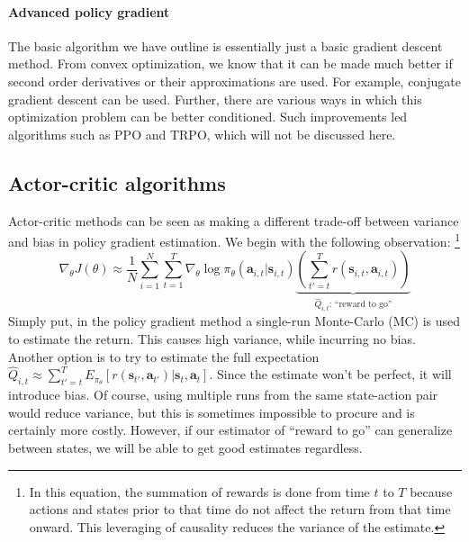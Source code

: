 \paragraph{Advanced policy gradient}
The basic algorithm we have outline is essentially just a basic
gradient descent method. 
From convex optimization, we know that it can be made much better if second order derivatives
or their approximations are used.
For example, conjugate gradient descent can be used.
Further, there are various ways in which this optimization problem can be better conditioned.
Such improvements led algorithms such as PPO and TRPO,
which will not be discussed here.

\subsection{Actor-critic algorithms}
Actor-critic methods can be seen as making a different trade-off between 
variance and bias in policy gradient estimation.
We begin with the following observation:
\footnote{In this equation, the summation of rewards is done from time $t   $
		to $ T  $ because actions and states prior to that time do
		not affect the return from that time onward.
This leveraging of causality reduces the variance of the estimate.}
\begin{equation}
		\nabla_\theta J(\theta) \approx 
		\frac{1}{N} \sum_{i=1}^{N} \sum_{t=1}^{T} \nabla_\theta \log \pi_\theta (\bm{a}_{i,t}| \bm{s}_{i,t})
		\underbrace{\left ( \sum_{t'=t}^{T} r (\bm{s}_{i,t}, \bm{a}_{i,t}) \right )}_{\hat{Q}_{i,t}
		\text{: ``reward to go''}}
\end{equation}
Simply put, in the policy gradient method a single-run Monte-Carlo (MC) is used
to estimate the return.
This causes high variance, while incurring no bias.
Another option is to try to estimate the full expectation
$ \hat{Q}_{i,t} \approx  \sum_{t'=t}^{T} E_{\pi_\theta} \left[ r(\bm{s}_{t'}, \bm{a}_{t'}) |\bm{s}_{t}, \bm{a}_{t}  \right]     $.
Since the estimate won't be perfect, it will introduce bias.
Of course, using multiple runs from the same state-action pair would 
reduce variance, but this is sometimes impossible to procure
and is certainly more costly.
However, if our estimator of ``reward to go'' can generalize between states,
we will be able to get good estimates regardless.

